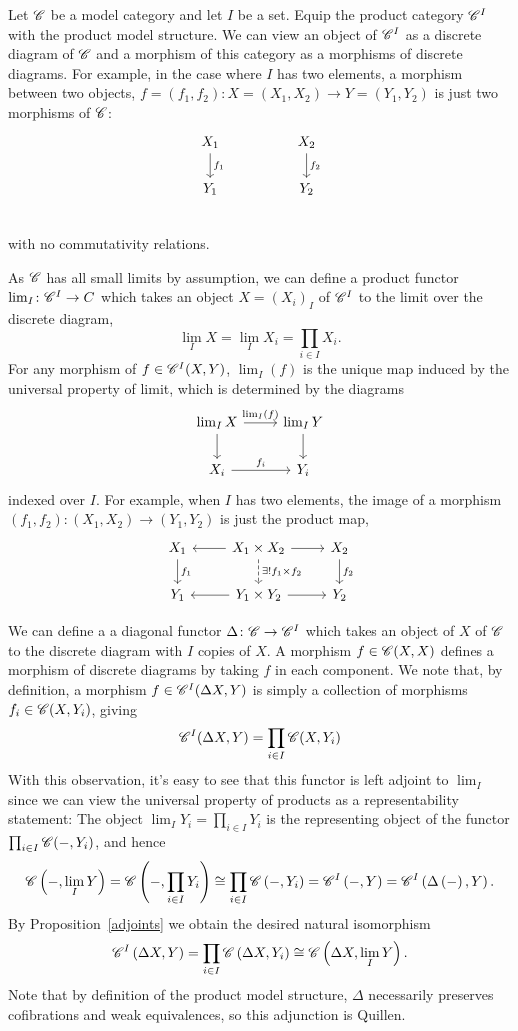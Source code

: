 \documentclass[10pt]{amsart}
\begin{document}
\begin{ex}
  Let $\mathscr{C}$ be a model category and let $I$ be a set.
  Equip the product category $\mathscr{C}^I$ with the product model structure.
  We can view an object of $\mathscr{C}^I$ as a discrete diagram of $\mathscr{C}$ and a morphism of this category as a morphisms of discrete diagrams.
  For example, in the case where $I$ has two elements, a morphism between two objects, $f = (f_1, f_2) \colon X = (X_1, X_2) \to Y = (Y_1, Y_2)$ is just two morphisms of $\mathscr{C}$:
  $$\begin{tikzcd}
    X_1\arrow{d}{f_1} & & X_2\arrow{d}{f_2}\\
    Y_1 & & Y_2\\
  \end{tikzcd}$$
  with no commutativity relations.
  
  As $\mathscr{C}$ has all small limits by assumption, we can define a product functor $\lim_I \colon \mathscr{C}^I \to C$ which takes an object $X = (X_i)_I$ of $\mathscr{C}^I$ to the limit over the discrete diagram, 
  $$\lim_I X = \lim_I X_i = \prod_{i \in I} X_i.$$
  For any morphism of $f \in \mathscr{C}^I(X,Y)$, $\lim_I(f)$ is the unique map induced by the universal property of limit, which is determined by the diagrams
  $$\begin{tikzcd}
    \lim_I X \arrow{r}{\lim_I(f)}\arrow{d} & \lim_I Y\arrow{d}\\
    X_i \arrow{r}{f_i} & Y_i
  \end{tikzcd}$$
  indexed over $I$.
  For example, when $I$ has two elements, the image of a morphism $(f_1, f_2) \colon (X_1,X_2) \to (Y_1, Y_2)$ is just the product map,
  $$\begin{tikzcd}
    X_1 \arrow{d}{f_1} & X_1 \times X_2\arrow{r}\arrow{l}\arrow[dashed]{d}{\exists ! f_1 \times f_2} & X_2\arrow{d}{f_2}\\
    Y_1 & Y_1 \times Y_2 \arrow{l}\arrow{r} & Y_2
  \end{tikzcd}$$

  We can define a a diagonal functor
  $\Delta \colon \mathscr{C} \to \mathscr{C}^I$
  which takes an object of $X$ of $\mathscr{C}$ to the discrete diagram with $I$ copies of $X$.
  A morphism $f \in \mathscr{C}(X,X)$ defines a morphism of discrete diagrams by taking $f$ in each component.
  We note that, by definition, a morphism $f \in \mathscr{C}^I(\Delta X, Y)$ is simply a collection of morphisms $f_i \in \mathscr{C}(X, Y_i)$, giving
  $$\mathscr{C}^I(\Delta X, Y) = \prod_{i \in I}\mathscr{C}(X, Y_i)$$
  With this observation, it's easy to see that this functor is left adjoint to $\lim_I$ since we can view the universal property of products as a representability statement:
  The object $\lim_I Y_i = \prod_{i \in I} Y_i$ is the representing object of the functor $\prod_{i \in I} \mathscr{C}(- ,Y_i)$, and hence
  $$\mathscr{C}\left(-, \lim_I Y\right) = \mathscr{C}\left(-,\prod_{i \in I} Y_i\right) \cong \prod_{i \in I} \mathscr{C}\left( -, Y_i\right) = \mathscr{C}^I\left(- , Y\right) = \mathscr{C}^I\left(\Delta\left(-\right), Y\right).$$
  By Proposition~\ref{adjoints} we obtain the desired natural isomorphism
  $$\mathscr{C}^I\left(\Delta X, Y\right) = \prod_{i \in I} \mathscr{C}\left(\Delta X, Y_i\right) \cong \mathscr{C}\left(\Delta X, \lim_I Y\right).$$
  Note that by definition of the product model structure, $\Delta$ necessarily preserves cofibrations and weak equivalences, so this adjunction is Quillen.
\end{ex}
\end{document}
